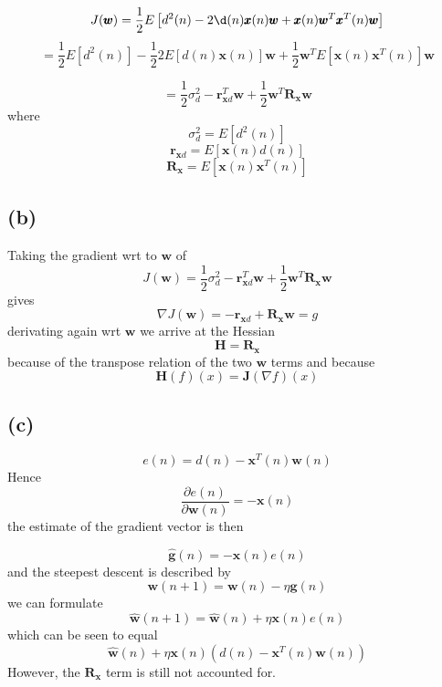 \documentclass[paper=a4, fontsize=11pt]{scrartcl} %
\begin{document}
$$ J(\pmb{w}) = \frac{1}{2} E\left[ d^2(n)-2\d(n) \pmb{x}(n)\pmb{w} + \pmb{x}(n)\pmb{w}^T\pmb{x}^T(n)\pmb{w} \right]$$
$$ = 
\frac{1}{2}  E\left[ d^2(n)\right] - 
\frac{1}{2}  2  E\left[d(n) \pmb{x}(n) \right]\pmb{w} + 
\frac{1}{2}  \pmb{w}^T  E\left[\pmb{x}(n) \pmb{x}^T(n) \right]\pmb{w}$$

$$ = 
\frac{1}{2}  \sigma_d^2 - 
\pmb{r}_{\pmb{x}d}^T\pmb{w} + 
\frac{1}{2}  \pmb{w}^T \pmb{R_x}  \pmb{w}$$
where
$$ \sigma_d^2 = E\left[ d^2(n)\right]$$
$$ \pmb{r}_{\pmb{x}d} = E\left[ \pmb{x}(n) d(n) \right]$$
$$ \pmb{R_x} = E\left[\pmb{x}(n) \pmb{x}^T(n) \right]$$
\subsection{ (b) }
Taking the gradient wrt to $\pmb{w}$ of  
$$
J(\pmb{w}) = 
\frac{1}{2}  \sigma_d^2 - 
\pmb{r}_{\pmb{x}d}^T\pmb{w} + 
\frac{1}{2}  \pmb{w}^T \pmb{R_x}  \pmb{w}$$
gives 
$$
\nabla J(\pmb{w}) = 
- \pmb{r}_{\pmb{x}d} + 
 \pmb{R_x}  \pmb{w} = g$$
 derivating again wrt $\pmb{w}$ we arrive at the Hessian
 $$  \pmb{H} =  \pmb{R_x}$$
 because of the transpose relation of the two $\pmb{w}$ terms and because 
 $$ \pmb{H}(f)(x)=\pmb{J}(\nabla f)(x)$$
\subsection{ (c) }
$$ e(n) = d(n) - \pmb{x}^T(n)\pmb{w}(n)$$
Hence
$$ \frac{\partial e(n)}{\partial \pmb{w}(n)} = -\pmb{x}(n) $$
the estimate of the gradient vector is then 

$$ \pmb{\hat g}(n) = -\pmb{x}(n)e(n) $$
and the steepest descent is described by
$$ \pmb{w}(n+1) = \pmb{w}(n) - \eta\pmb{g}(n)$$
we can formulate 
$$ \pmb{\hat w}(n+1) = \pmb{\hat w}(n) + \eta\pmb{x}(n)e(n) $$
which can be seen to equal 
$$\pmb{\hat w}(n) + \eta\pmb{x}(n)(d(n) - \pmb{x}^T(n)\pmb{w}(n)) $$
However, the $\pmb{R_x}$ term is still not accounted for.
\end{document}
